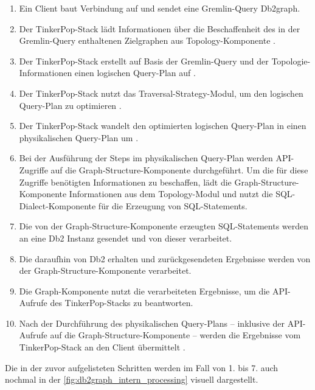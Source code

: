 \begin{enumerate}
    \item Ein Client baut Verbindung auf und sendet eine Gremlin-Query Db2graph.
    \item Der TinkerPop-Stack lädt Informationen über die Beschaffenheit des in der Gremlin-Query enthaltenen Zielgraphen aus Topology-Komponente \cite{vldb_tian,sigmod_tian, yt_tian}.
    \item Der TinkerPop-Stack erstellt auf Basis der Gremlin-Query und der Topologie-Informationen einen logischen Query-Plan auf \cite{vldb_tian,sigmod_tian, yt_tian}. 
    \item Der TinkerPop-Stack nutzt das Traversal-Strategy-Modul, um den logischen Query-Plan zu optimieren \cite{vldb_tian,sigmod_tian, yt_tian}.
    \item Der TinkerPop-Stack wandelt den optimierten logischen Query-Plan in einen physikalischen Query-Plan um \cite{vldb_tian,sigmod_tian, yt_tian}. 
    \item Bei der Ausführung der Steps im physikalischen Query-Plan werden API-Zugriffe auf die Graph-Structure-Komponente durchgeführt. Um die für diese Zugriffe benötigten Informationen zu beschaffen, lädt die Graph-Structure-Komponente Informationen aus dem Topology-Modul und nutzt die SQL-Dialect-Komponente für die Erzeugung von SQL-Statements. \cite{vldb_tian,sigmod_tian, yt_tian} 
    \item Die von der Graph-Structure-Komponente erzeugten SQL-Statements werden an eine Db2 Instanz gesendet und von dieser verarbeitet. \cite{vldb_tian,sigmod_tian, yt_tian}
    \item Die daraufhin von Db2 erhalten und zurückgesendeten Ergebnisse werden von der Graph-Structure-Komponente verarbeitet. \cite{yt_tian} 
    \item Die Graph-Komponente nutzt die verarbeiteten Ergebnisse, um die API-Aufrufe des TinkerPop-Stacks zu beantworten. \cite{vldb_tian,sigmod_tian, yt_tian} 
    \item Nach der Durchführung des physikalischen Query-Plans -- inklusive der API-Aufrufe auf die Graph-Structure-Komponente -- werden die Ergebnisse vom TinkerPop-Stack an den Client übermittelt \cite{vldb_tian,sigmod_tian, yt_tian}.
\end{enumerate}

Die in der zuvor aufgelisteten Schritten werden im Fall von 1. bis 7. auch nochmal in der \autoref{fig:db2graph_intern_processing} visuell dargestellt.

